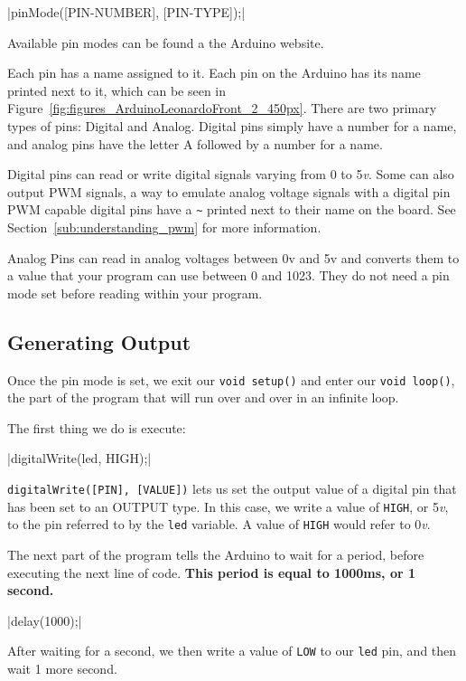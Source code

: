 \documentclass[11pt,a4paper]{article}
\begin{document}
|pinMode([PIN-NUMBER], [PIN-TYPE]);|

Available pin modes can be found a the Arduino website.\cite{pin_mode}

Each pin has a name assigned to it.  Each pin on the Arduino has its name printed next to it, which can be seen in Figure~\ref{fig:figures_ArduinoLeonardoFront_2_450px}.  There are two primary types of pins:  Digital and Analog.  Digital pins simply have a number for a name, and analog pins have the letter A followed by a number for a name.

Digital pins can read or write digital signals varying from 0 to 5\emph{v}.  Some can also output PWM signals, a way to emulate analog voltage signals with a digital pin PWM capable digital pins have a \texttt{\~} printed next to their name on the board.  See Section~\ref{sub:understanding_pwm} for more information.

Analog Pins can read in analog voltages between 0v and 5v and converts them to a value that your program can use between 0 and 1023.  They do not need a pin mode set before reading within your program.


\subsection{Generating Output} %
\label{sub:generating_output}

Once the pin mode is set, we exit our \texttt{void setup()} and enter our \texttt{void loop()}, the part of the program that will run over and over in an infinite loop. 

The first thing we do is execute: 

|digitalWrite(led, HIGH);|

\texttt{digitalWrite([PIN], [VALUE])} lets us set the output value of a digital pin that has been set to an OUTPUT type.  In this case, we write a value of \texttt{HIGH}, or 5\emph{v}, to the pin referred to by the \texttt{led} variable.  A value of \texttt{HIGH} would refer to 0\emph{v}.

The next part of the program tells the Arduino to wait for a period, before executing the next line of code.  \textbf{This period is equal to 1000ms, or 1 second.}

|delay(1000);|

After waiting for a second, we then write a value of \texttt{LOW} to our \texttt{led} pin, and then wait 1 more second.
\end{document}
